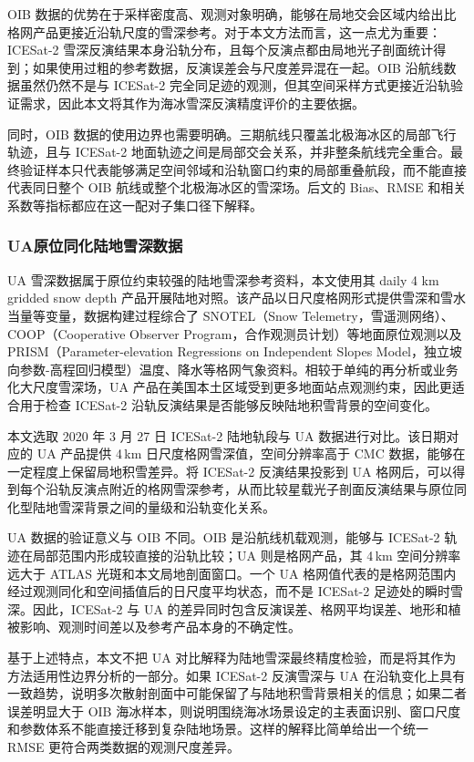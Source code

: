 OIB 数据的优势在于采样密度高、观测对象明确，能够在局地交会区域内给出比格网产品更接近沿轨尺度的雪深参考。对于本文方法而言，这一点尤为重要：ICESat-2 雪深反演结果本身沿轨分布，且每个反演点都由局地光子剖面统计得到；如果使用过粗的参考数据，反演误差会与尺度差异混在一起。OIB 沿航线数据虽然仍然不是与 ICESat-2 完全同足迹的观测，但其空间采样方式更接近沿轨验证需求，因此本文将其作为海冰雪深反演精度评价的主要依据。

同时，OIB 数据的使用边界也需要明确。三期航线只覆盖北极海冰区的局部飞行轨迹，且与 ICESat-2 地面轨迹之间是局部交会关系，并非整条航线完全重合。最终验证样本只代表能够满足空间邻域和沿轨窗口约束的局部重叠航段，而不能直接代表同日整个 OIB 航线或整个北极海冰区的雪深场。后文的 Bias、RMSE 和相关系数等指标都应在这一配对子集口径下解释。

\subsubsection{UA原位同化陆地雪深数据}
UA 雪深数据属于原位约束较强的陆地雪深参考资料，本文使用其 daily 4 km gridded snow depth 产品开展陆地对照\citep{UA_SnowDepth}。该产品以日尺度格网形式提供雪深和雪水当量等变量，数据构建过程综合了 SNOTEL（Snow Telemetry，雪遥测网络）、COOP（Cooperative Observer Program，合作观测员计划）等地面原位观测以及 PRISM（Parameter-elevation Regressions on Independent Slopes Model，独立坡向参数-高程回归模型）温度、降水等格网气象资料。相较于单纯的再分析或业务化大尺度雪深场，UA 产品在美国本土区域受到更多地面站点观测约束，因此更适合用于检查 ICESat-2 沿轨反演结果是否能够反映陆地积雪背景的空间变化。

本文选取 2020 年 3 月 27 日 ICESat-2 陆地轨段与 UA 数据进行对比。该日期对应的 UA 产品提供 4\,km 日尺度格网雪深值，空间分辨率高于 CMC 数据，能够在一定程度上保留局地积雪差异。将 ICESat-2 反演结果投影到 UA 格网后，可以得到每个沿轨反演点附近的格网雪深参考，从而比较星载光子剖面反演结果与原位同化型陆地雪深背景之间的量级和沿轨变化关系。

UA 数据的验证意义与 OIB 不同。OIB 是沿航线机载观测，能够与 ICESat-2 轨迹在局部范围内形成较直接的沿轨比较；UA 则是格网产品，其 4\,km 空间分辨率远大于 ATLAS 光斑和本文局地剖面窗口。一个 UA 格网值代表的是格网范围内经过观测同化和空间插值后的日尺度平均状态，而不是 ICESat-2 足迹处的瞬时雪深。因此，ICESat-2 与 UA 的差异同时包含反演误差、格网平均误差、地形和植被影响、观测时间差以及参考产品本身的不确定性。

基于上述特点，本文不把 UA 对比解释为陆地雪深最终精度检验，而是将其作为方法适用性边界分析的一部分。如果 ICESat-2 反演雪深与 UA 在沿轨变化上具有一致趋势，说明多次散射剖面中可能保留了与陆地积雪背景相关的信息；如果二者误差明显大于 OIB 海冰样本，则说明围绕海冰场景设定的主表面识别、窗口尺度和参数体系不能直接迁移到复杂陆地场景。这样的解释比简单给出一个统一 RMSE 更符合两类数据的观测尺度差异。

